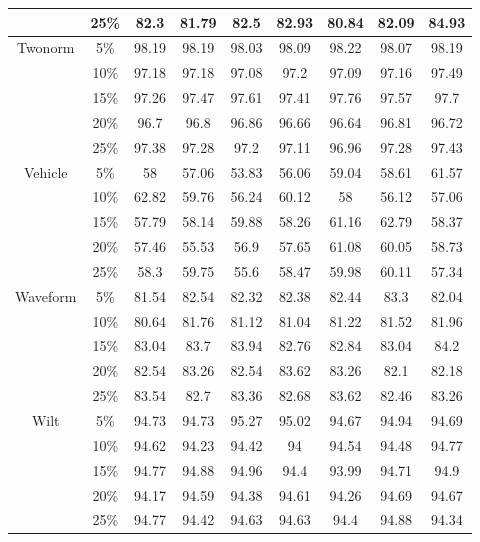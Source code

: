 \begin{longtable}[c]{|c|c|c|c|c|c|c|c|c|}
& 25\% & 82.3 & 81.79 & 82.5 & 82.93 & 80.84 & 82.09 & 84.93 \\ \hline
\multirow{5}{*}{Twonorm}
& 5\% & 98.19 & 98.19 & 98.03 & 98.09 & 98.22 & 98.07 & 98.19 \\ 
& 10\% & 97.18 & 97.18 & 97.08 & 97.2 & 97.09 & 97.16 & 97.49 \\
& 15\% & 97.26 & 97.47 & 97.61 & 97.41 & 97.76 & 97.57 & 97.7 \\
& 20\% & 96.7 & 96.8 & 96.86 & 96.66 & 96.64 & 96.81 & 96.72 \\
& 25\% & 97.38 & 97.28 & 97.2 & 97.11 & 96.96 & 97.28 & 97.43 \\ \hline
\multirow{5}{*}{Vehicle}
& 5\% & 58 & 57.06 & 53.83 & 56.06 & 59.04 & 58.61 & 61.57 \\ 
& 10\% & 62.82 & 59.76 & 56.24 & 60.12 & 58 & 56.12 & 57.06 \\
& 15\% & 57.79 & 58.14 & 59.88 & 58.26 & 61.16 & 62.79 & 58.37 \\
& 20\% & 57.46 & 55.53 & 56.9 & 57.65 & 61.08 & 60.05 & 58.73 \\
& 25\% & 58.3 & 59.75 & 55.6 & 58.47 & 59.98 & 60.11 & 57.34 \\ \hline
\multirow{5}{*}{Waveform}
& 5\% & 81.54 & 82.54 & 82.32 & 82.38 & 82.44 & 83.3 & 82.04 \\ 
& 10\% & 80.64 & 81.76 & 81.12 & 81.04 & 81.22 & 81.52 & 81.96 \\
& 15\% & 83.04 & 83.7 & 83.94 & 82.76 & 82.84 & 83.04 & 84.2 \\
& 20\% & 82.54 & 83.26 & 82.54 & 83.62 & 83.26 & 82.1 & 82.18 \\
& 25\% & 83.54 & 82.7 & 83.36 & 82.68 & 83.62 & 82.46 & 83.26 \\ \hline
\multirow{5}{*}{Wilt}
& 5\% & 94.73 & 94.73 & 95.27 & 95.02 & 94.67 & 94.94 & 94.69 \\ 
& 10\% & 94.62 & 94.23 & 94.42 & 94 & 94.54 & 94.48 & 94.77 \\
& 15\% & 94.77 & 94.88 & 94.96 & 94.4 & 93.99 & 94.71 & 94.9 \\
& 20\% & 94.17 & 94.59 & 94.38 & 94.61 & 94.26 & 94.69 & 94.67 \\
& 25\% & 94.77 & 94.42 & 94.63 & 94.63 & 94.4 & 94.88 & 94.34 \\ \hline
\end{longtable}

